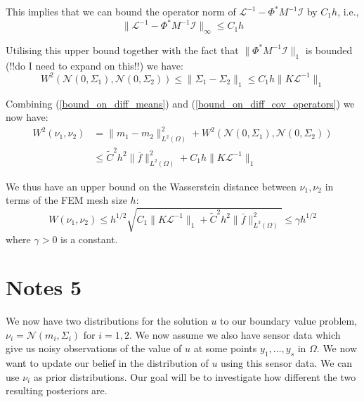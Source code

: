\documentclass{article}
\theoremstyle{definition}
\theoremstyle{remark}
\begin{document}
This implies that we can bound the operator norm of $\mathcal{L}^{-1}-\Phi^{*}M^{-1}\mathcal{I}$ by $C_{1}h$, i.e.,
\begin{equation}
    \label{bound_on_diff_of_solution_operators}
    \|\mathcal{L}^{-1}-\Phi^{*}M^{-1}\mathcal{I}\|_{\infty}\leq C_{1}h
\end{equation}

Utilising this upper bound together with the fact that $\|\Phi^{*}M^{-1}\mathcal{I}\|_{1}$ is bounded (!!do I need to expand on this!!) we have:
\begin{equation}
    \label{bound_on_diff_cov_operators}
    W^{2}(\mathcal{N}(0,\Sigma_1),\mathcal{N}(0,\Sigma_2))\leq\|\Sigma_{1}-\Sigma_{2}\|_{1}\leq C_{1}h\|K\mathcal{L}^{-1}\|_{1}
\end{equation}

Combining (\ref{bound_on_diff_means}) and (\ref{bound_on_diff_cov_operators}) we now have:
\begin{align*}
    W^{2}(\nu_{1},\nu_{2})&=\|m_1-m_2\|_{L^{2}(\Omega)}^{2}+W^{2}(\mathcal{N}(0,\Sigma_1),\mathcal{N}(0,\Sigma_2)) \\
    &\leq \tilde{C}^{2}h^2\|\bar{f}\|^{2}_{L^{2}(\Omega)} + C_{1}h\|K\mathcal{L}^{-1}\|_{1}
\end{align*}

We thus have an upper bound on the Wasserstein distance between $\nu_{1},\nu_{2}$ in terms of the FEM mesh size $h$:
\begin{equation}
    \label{bound_on_distance}
    W(\nu_{1},\nu_{2})\leq h^{1/2}\sqrt{C_{1}\|K\mathcal{L}^{-1}\|_{1}+\tilde{C}^{2}h^{2}\|\bar{f}\|^{2}_{L^{2}(\Omega)}}\leq\gamma h^{1/2}
\end{equation}
where $\gamma>0$ is a constant.

\section{Notes 5}

\noindent We now have two distributions for the solution $u$ to our boundary value problem, $\nu_{i}=\mathcal{N}(m_i,\Sigma_{i})$ for $i=1,2$. We now assume we also have sensor data which give us noisy observations of the value of $u$ at some points $y_{1},\dots,y_{s}$ in $\Omega$. We now want to update our belief in the distribution of $u$ using this sensor data. We can use $\nu_{i}$ as prior distributions. Our goal will be to investigate how different the two resulting posteriors are. \\
\end{document}
